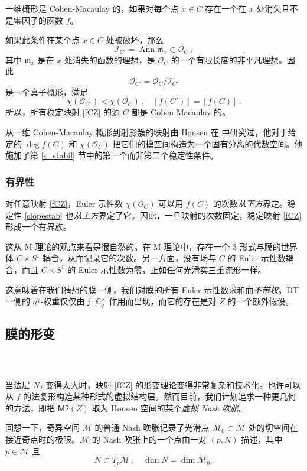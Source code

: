 \documentclass[12pt]{article}
\newcommand{\cO}{\mathscr{O}}
\newcommand{\cM}{\mathcal{M}}
\newcommand{\fm}{\mathfrak{m}}
\DeclareMathOperator{\Ann}{Ann}
\newcommand{\cI}{\mathscr{I}}
\newcommand{\Ct}{\mathbb{C}^{\times}}
\newcommand{\Cq}{\Ct_q}
\newcommand{\MM}{\textsf{M2}}
\theoremstyle{definition}
\begin{document}
一维概形是 Cohen-Macaulay 的，如果对每个点 $x\in C$ 存在一个在 $x$ 处消失且不是零因子的函数 $f$。

如果此条件在某个点 $x\in C$ 处被破坏，那么
$$
\cI_{C'}=\Ann \fm_x \subset \cO_C\,,
$$
其中 $\fm_x$ 是在 $x$ 处消失的函数的理想，是 $\cO_C$ 的一个有限长度的非平凡理想。因此
$$
\cO_{C'} = \cO_{C} / \cI_{C'}
$$
是一个真子概形，满足
$$
\chi(\cO_{C'}) < \chi(\cO_{C})\,, \quad [f(C')] =  [f(C)] \,.
$$
所以，所有稳定映射 \eqref{fCZ} 的源 $C$ 都是 Cohen-Macaulay 的。

从一维 Cohen-Macaulay 概形到射影簇的映射由 H{\o}nsen 在 \cite{Hon} 中研究过，他对于给定的 $\deg f(C)$ 和 $\chi (\cO_C)$ 把它们的模空间构造为一个固有分离的代数空间。他施加了第 \ref{s_stabil} 节中的第一个而非第二个稳定性条件。

\subsubsection{有界性}

对任意映射 \eqref{fCZ}，Euler 示性数 $\chi(\cO_C)$ 可以用 $f(C)$ 的次数\emph{从下方}界定。稳定性 \eqref{slopestab} 也\emph{从上方}界定了它。因此，一旦映射的次数固定，稳定映射 \eqref{fCZ} 形成一个有界族。

这从 M-理论的观点来看是很自然的。在 M-理论中，存在一个 $3$-形式与膜的世界体 $C \times S^1$ 耦合，从而记录它的次数。另一方面，没有场与 $C$ 的 Euler 示性数耦合，而且 $C \times S^1$ 的 Euler 示性数为零，正如任何光滑实三重流形一样。

这意味着在我们猜想的膜一侧，我们对膜的所有 Euler 示性数求和而\emph{不带权}。DT 一侧的 $q^{\chi}$-权重仅仅由于 $\Cq$ 作用而出现，而它的存在是对 $Z$ 的一个额外假设。

\subsection{膜的形变}

\subsubsection{\ }

当法层 $N_f$ 变得太大时，映射 \eqref{fCZ} 的形变理论变得非常复杂和技术化。也许可以从 $f$ 的法复形构造某种形式的虚拟结构层。然而目前，我们计划追求一种更几何的方法，即把 $\MM(Z)$ 取为 H{\o}nsen 空间的某个\emph{虚拟 Nash 吹胀}。

回想一下，奇异空间 $\cM$ 的普通 Nash 吹胀记录了光滑点 $\cM_0 \subset \cM$ 处的切空间在接近奇点时的极限。$\cM$ 的 Nash 吹胀上的一个点由一对 $(p,N)$ 描述，其中 $p\in \cM$ 且
$$
N \subset T_p \cM \,, \quad \dim N = \dim \cM_0 \,.
$$
\end{document}
